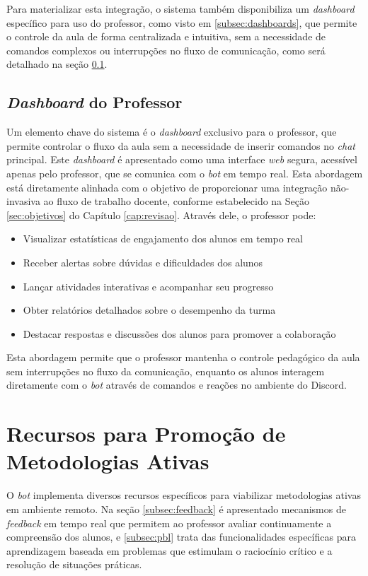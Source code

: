 Para materializar esta integração, o sistema também disponibiliza um
\textit{dashboard} específico para uso do professor, como visto em
\ref{subsec:dashboards}, que permite o controle da aula de forma centralizada e
intuitiva, sem a necessidade de comandos complexos ou interrupções no fluxo de
comunicação, como será detalhado na seção \ref{subsec:dashboard}.

\subsection{\textit{Dashboard} do Professor}
\label{subsec:dashboard}

Um elemento chave do sistema é o \textit{dashboard} exclusivo para o professor,
que permite controlar o fluxo da aula sem a necessidade de inserir comandos no
\textit{chat} principal. Este \textit{dashboard} é apresentado como uma
interface \textit{web} segura, acessível apenas pelo professor, que se comunica
com o \textit{bot} em tempo real. Esta abordagem está diretamente alinhada com o
objetivo de proporcionar uma integração não-invasiva ao fluxo de trabalho
docente, conforme estabelecido na Seção \ref{sec:objetivos} do Capítulo
\ref{cap:revisao}. Através dele, o professor pode:

\begin{itemize}
\item Visualizar estatísticas de engajamento dos alunos em tempo real
\item Receber alertas sobre dúvidas e dificuldades dos alunos
\item Lançar atividades interativas e acompanhar seu progresso
\item Obter relatórios detalhados sobre o desempenho da turma
\item Destacar respostas e discussões dos alunos para promover a colaboração
\end{itemize}

Esta abordagem permite que o professor mantenha o controle pedagógico da aula
sem interrupções no fluxo da comunicação, enquanto os alunos interagem
diretamente com o \textit{bot} através de comandos e reações no ambiente do
Discord.

\section{Recursos para Promoção de Metodologias Ativas}
\label{sec:recursos}

O \textit{bot} implementa diversos recursos específicos para viabilizar
metodologias ativas em ambiente remoto. Na seção \ref{subsec:feedback} é
apresentado mecanismos de \textit{feedback} em tempo real que permitem ao
professor avaliar continuamente a compreensão dos alunos, e \ref{subsec:pbl}
trata das funcionalidades específicas para aprendizagem baseada em problemas que
estimulam o raciocínio crítico e a resolução de situações práticas.

